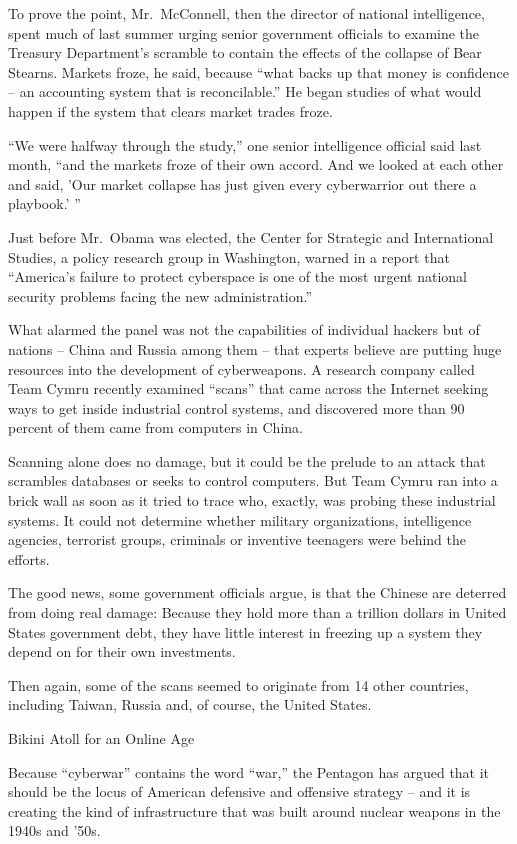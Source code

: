 \documentclass[12pt,a4paper,onecolumn]{article}
\begin{document}
To prove the point, Mr.~McConnell, then the director of national intelligence, spent much of last
summer urging senior government officials to examine the Treasury Department's scramble to contain
the effects of the collapse of Bear Stearns. Markets froze, he said, because ``what backs up that
money is confidence -- an accounting system that is reconcilable.'' He began studies of what would
happen if the system that clears market trades froze.

``We were halfway through the study,'' one senior intelligence official said last month, ``and the
markets froze of their own accord. And we looked at each other and said, 'Our market collapse has
just given every cyberwarrior out there a playbook.' ''

Just before Mr.~Obama was elected, the Center for Strategic and International Studies, a policy
research group in Washington, warned in a report that ``America's failure to protect cyberspace is
one of the most urgent national security problems facing the new administration.''

What alarmed the panel was not the capabilities of individual hackers but of nations -- China and
Russia among them -- that experts believe are putting huge resources into the development of
cyberweapons. A research company called Team Cymru recently examined ``scans'' that came across the
Internet seeking ways to get inside industrial control systems, and discovered more than 90 percent
of them came from computers in China.

Scanning alone does no damage, but it could be the prelude to an attack that scrambles databases or
seeks to control computers. But Team Cymru ran into a brick wall as soon as it tried to trace who,
exactly, was probing these industrial systems. It could not determine whether military
organizations, intelligence agencies, terrorist groups, criminals or inventive teenagers were behind
the efforts.

The good news, some government officials argue, is that the Chinese are deterred from doing real
damage: Because they hold more than a trillion dollars in United States government debt, they have
little interest in freezing up a system they depend on for their own investments.

Then again, some of the scans seemed to originate from 14 other countries, including Taiwan, Russia
and, of course, the United States.

Bikini Atoll for an Online Age

Because ``cyberwar'' contains the word ``war,'' the Pentagon has argued that it should be the locus
of American defensive and offensive strategy -- and it is creating the kind of infrastructure that
was built around nuclear weapons in the 1940s and '50s.
\end{document}
